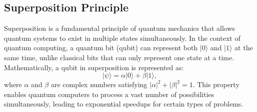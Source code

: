 \documentclass[12pt,a4paper]{report}
\begin{document}
\subsection{Superposition Principle}
Superposition is a fundamental principle of quantum mechanics that allows quantum systems to exist in multiple states simultaneously. In the context of quantum computing, a quantum bit (qubit) can represent both \( |0\rangle \) and \( |1\rangle \) at the same time, unlike classical bits that can only represent one state at a time. Mathematically, a qubit in superposition is represented as:
\[
|\psi\rangle = \alpha |0\rangle + \beta |1\rangle,
\]
where \( \alpha \) and \( \beta \) are complex numbers satisfying \( |\alpha|^2 + |\beta|^2 = 1 \). This property enables quantum computers to process a vast number of possibilities simultaneously, leading to exponential speedups for certain types of problems.
\end{document}

